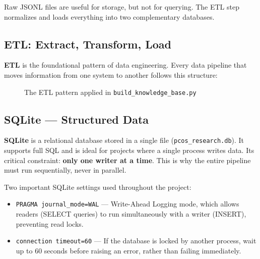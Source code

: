 \documentclass[11pt,a4paper]{article}
\begin{document}
Raw JSONL files are useful for storage, but not for querying. The ETL step
normalizes and loads everything into two complementary databases.

\subsection{ETL: Extract, Transform, Load}

\textbf{ETL} is the foundational pattern of data engineering. Every data pipeline
that moves information from one system to another follows this structure:

\begin{figure}[H]
\centering
{}
\caption{The ETL pattern applied in \texttt{build\_knowledge\_base.py}}
\end{figure}

\subsection{SQLite --- Structured Data}

\textbf{SQLite} is a relational database stored in a single file (\texttt{pcos\_research.db}).
It supports full SQL and is ideal for projects where a single process writes data.
Its critical constraint: \textbf{only one writer at a time}. This is why the entire
pipeline must run sequentially, never in parallel.

Two important SQLite settings used throughout the project:

\begin{itemize}[noitemsep]
\item \texttt{PRAGMA journal\_mode=WAL} --- Write-Ahead Logging mode, which allows
  readers (SELECT queries) to run simultaneously with a writer (INSERT), preventing
  read locks.
\item \texttt{connection timeout=60} --- If the database is locked by another process,
  wait up to 60 seconds before raising an error, rather than failing immediately.
\end{itemize}
\end{document}
